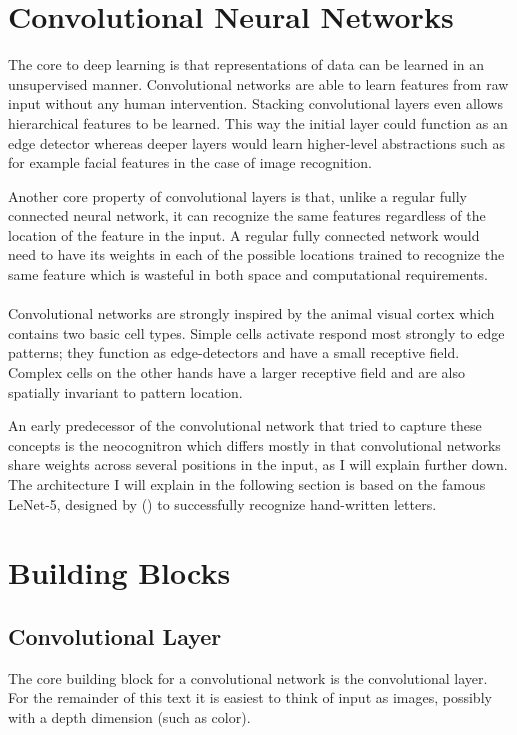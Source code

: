 \section{Convolutional Neural Networks}
\label{sec:cnn}
The core to deep learning is that representations
of data can be learned in an unsupervised manner.
Convolutional networks are able to learn features
from raw input without any human intervention.
Stacking convolutional layers even allows
hierarchical features to be learned.
This way the initial layer could function
as an edge detector
whereas deeper layers
would learn higher-level abstractions
such as for example facial features
in the case of image recognition.

Another core property of convolutional layers is that,
unlike a regular fully connected neural network,
it can recognize the same features
regardless of the location of the feature in the input.
A regular fully connected network would need to have
its weights in each of the possible locations trained to recognize the same feature
which is wasteful in both space and computational requirements.

\paragraph{}
Convolutional networks are strongly inspired
by the animal visual cortex which contains two basic cell types.
Simple cells activate respond most strongly to edge patterns;
they function as edge-detectors and have a small receptive field.
Complex cells on the other hands have a larger receptive field
and are also spatially invariant to pattern location.

An early predecessor of the convolutional network
that tried to capture these concepts
is the neocognitron
\parencite{Fukushima1980}
which differs mostly in that convolutional networks
share weights across several positions in the input,
as I will explain further down.
The architecture I will explain in the following section
is based on the famous LeNet-5,
designed by
\citeauthor{LeCun1998}
(\citeyear{LeCun1998})
to successfully recognize hand-written letters.

\section{Building Blocks}
\label{sec:building_blocks}

\subsection{Convolutional Layer}
The core building block for a convolutional network
is the convolutional layer.
For the remainder of this text it is easiest
to think of input as images, possibly
with a depth dimension (such as color).

